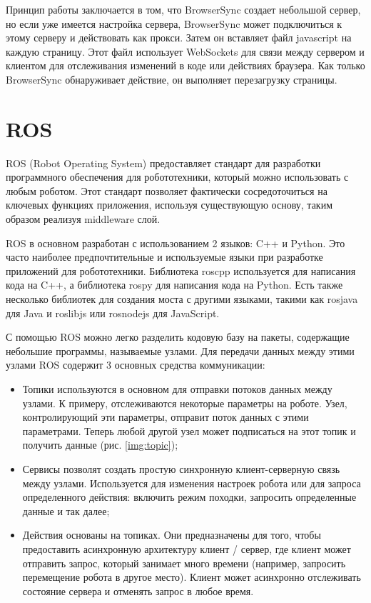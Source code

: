 Принцип работы заключается в том, что BrowserSync создает небольшой сервер, но если уже имеется настройка сервера, BrowserSync может подключиться к этому серверу и действовать как прокси. Затем он вставляет файл javascript на каждую страницу. Этот файл использует WebSockets для связи между сервером и клиентом для отслеживания изменений в коде или действиях браузера. Как только BrowserSync обнаруживает действие, он выполняет перезагрузку страницы.


\section{ROS}

ROS (Robot Operating System) предоставляет стандарт для разработки программного обеспечения для робототехники, который можно использовать с любым роботом. Этот стандарт позволяет фактически сосредоточиться на ключевых функциях приложения, используя существующую основу, таким образом реализуя middleware слой.

ROS в основном разработан с использованием 2 языков: C++ и Python. Это часто наиболее предпочтительные и используемые языки при разработке приложений для робототехники. Библиотека roscpp используется для написания кода на C++, а библиотека rospy для написания кода на Python. Есть также несколько библиотек для создания моста с другими языками, такими как rosjava для Java и roslibjs или rosnodejs для JavaScript.

С помощью ROS можно легко разделить кодовую базу на пакеты, содержащие небольшие программы, называемые узлами. Для передачи данных между этими узлами ROS содержит 3 основных средства коммуникации:

\begin{itemize}
	\item Топики используются в основном для отправки потоков данных между узлами. К примеру, отслеживаются некоторые параметры на роботе. Узел, контролирующий эти параметры, отправит поток данных с этими параметрами. Теперь любой другой узел может подписаться на этот топик и получить данные (рис. \ref{img:topic});
	\item Сервисы позволят создать простую синхронную клиент-серверную связь между узлами. Используется для изменения настроек робота или для запроса определенного действия: включить режим походки, запросить определенные данные и так далее;
	\item Действия основаны на топиках. Они предназначены для того, чтобы предоставить асинхронную архитектуру клиент / сервер, где клиент может отправить запрос, который занимает много времени (например, запросить перемещение робота в другое место). Клиент может асинхронно отслеживать состояние сервера и отменять запрос в любое время.
\end{itemize}

